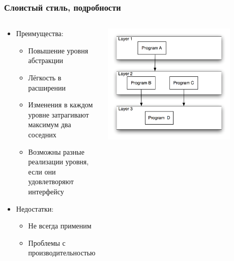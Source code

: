 \documentclass{../cscslides}
\begin{document}
    \begin{frame}
        \frametitle{Слоистый стиль, подробности}
        \begin{columns}
            \begin{column}{0.5\textwidth}
                \begin{itemize}
                    \item Преимущества:
                    \begin{itemize}
                        \item Повышение уровня абстракции
                        \item Лёгкость в расширении
                        \item Изменения в каждом уровне затрагивают максимум два соседних
                        \item Возможны разные реализации уровня, если они удовлетворяют интерфейсу
                    \end{itemize}
                    \item Недостатки:
                    \begin{itemize}
                        \item Не всегда применим
                        \item Проблемы с производительностью
                    \end{itemize}
                \end{itemize}
            \end{column}
            \begin{column}{0.5\textwidth}
                \begin{center}
                    \includegraphics[width=0.8\textwidth]{layered.png}
                \end{center}
            \end{column}
        \end{columns}
    \end{frame}
\end{document}
